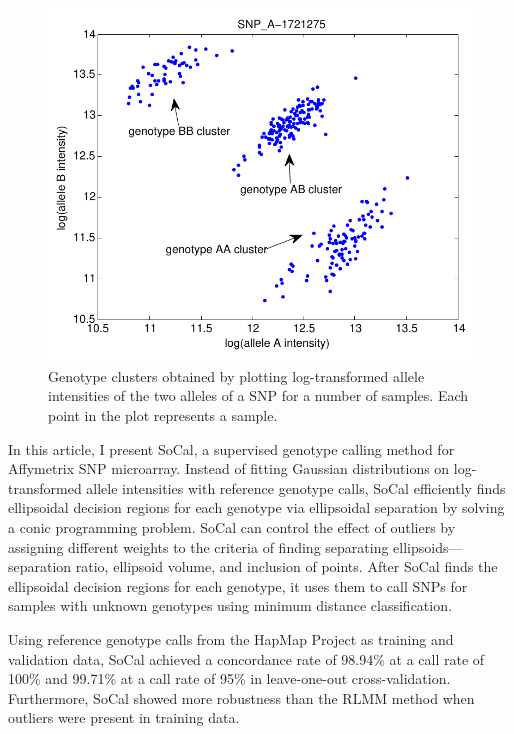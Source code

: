 \documentclass{scrartcl}
\begin{document}
\begin{figure}[H]
\centering
\includegraphics[scale=0.75]{intro_figs/intro_genotype_clusters.pdf}
\caption{Genotype clusters obtained by plotting log-transformed allele
intensities of the two alleles of a SNP for a number of samples.
Each point in the plot represents a sample.}
\label{fig:intro_genclus}
\end{figure}

\par
In this article, I present SoCal, a supervised genotype calling method
for Affymetrix SNP microarray.
Instead of fitting Gaussian distributions on log-transformed allele
intensities with reference genotype calls, SoCal efficiently finds ellipsoidal
decision regions for each genotype via ellipsoidal separation by solving a
conic programming problem.
SoCal can control the effect of outliers by assigning different weights to 
the criteria of finding separating ellipsoids---separation ratio, ellipsoid
volume, and inclusion of points. 
After SoCal finds the ellipsoidal decision regions for each genotype, it uses
them to call SNPs for samples with unknown genotypes using minimum distance
classification.

\par
Using reference genotype calls from the HapMap Project as training and
validation data, SoCal achieved a concordance rate of 98.94\% at a call rate
of 100\% and 99.71\% at a call rate of 95\% in leave-one-out
cross-validation.
Furthermore, SoCal showed more robustness than the RLMM method when outliers
were present in training data.
\end{document}

